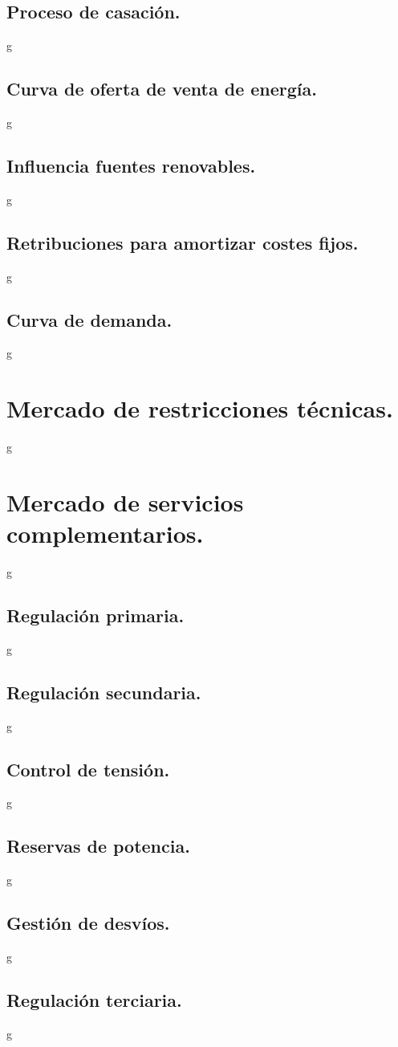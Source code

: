 \subsection{Proceso de casación.}
g
\subsection{Curva de oferta de venta de energía.}
g
\subsection{Influencia fuentes renovables.}
g
\subsection{Retribuciones para amortizar costes fijos.}
g
\subsection{Curva de demanda.}
g
\section{Mercado de restricciones técnicas.}
g
\section{Mercado de servicios complementarios.}
g
\subsection{Regulación primaria.}
g
\subsection{Regulación secundaria.}
g
\subsection{Control de tensión.}
g
\subsection{Reservas de potencia.}
g
\subsection{Gestión de desvíos.}
g
\subsection{Regulación terciaria.}
g
